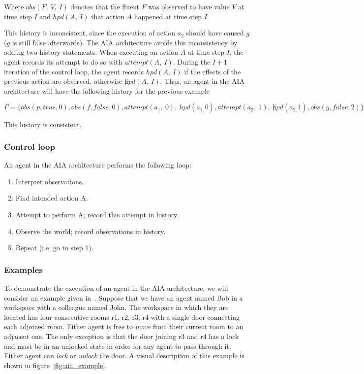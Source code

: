 Where $obs(F,\ V,\ I)$ denotes that the fluent $F$ was observed to have value $V$ at time step $I$ and $hpd(A,\ I)$ that action $A$ happened at time step $I$.

This history is inconsistent, since the execution of action $a_2$ should have caused $g$ ($g$ is still false afterwards).
The AIA architecture avoids this inconsistency by adding two history statements.
When executing an action $A$ at time step $I$, the agent records its attempt to do so with $attempt(A,\ I)$.
During the $I+1$ iteration of the control loop, the agent records $hpd(A,\ I)$ if the effects of the previous action are observed, otherwise $\not hpd(A,\ I)$.
Thus, an agent in the AIA architecture will have the following history for the previous example

$$
\Gamma=\{obs\left(p,true,0\right),obs\left(f,false,0\right),attempt(a_1,\ 0),\ hpd\left(a_{1,}0\right),attempt(a_2,\ 1),\ \not hpd\left(a_{2,}1\right),obs\left(g,false,2\right)\}
$$

This history is consistent.

\subsubsection{Control loop}
\label{subsubsec:control_loop}

An agent in the AIA architecture performs the following loop:

\begin{enumerate}
    \item Interpret observations.
    \item Find intended action A.
    \item Attempt to perform A;
        record this attempt in history.
    \item Observe the world;
        record observations in history.
    \item Repeat (i.e. go to step 1).
\end{enumerate}

\subsubsection{Examples}
\label{subsubsec:aia_examples}

To demonstrate the execution of an agent in the AIA architecture, we will consider an example given in~\cite{blount_architecture_2013}.
Suppose that we have an agent named Bob in a workspace with a colleague named John.
The workspace in which they are located has four consecutive rooms r1, r2, r3, r4 with a single door connecting each adjoined room.
Either agent is free to \textit{move} from their current room to an adjacent one.
The only exception is that the door joining r3 and r4 has a lock and must be in an unlocked state in order for any agent to pass through it.
Either agent can \textit{lock} or \textit{unlock} the door.
A visual description of this example is shown in figure~\ref{fig:aia_example}.


